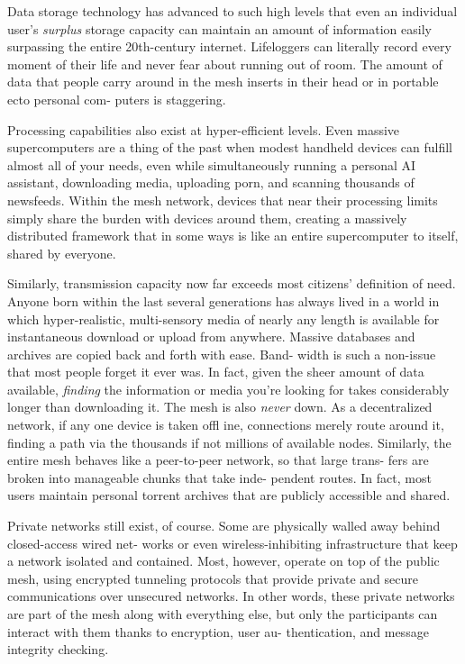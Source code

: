 Data storage technology has advanced to such high 
levels that even an individual user's \textit{surplus }storage 
capacity can maintain an amount of information 
easily surpassing the entire 20th-century internet. 
Lifeloggers can literally record every moment of their 
life and never fear about running out of room. The 
amount of data that people carry around in the mesh 
inserts in their head or in portable ecto personal com-
puters is staggering.

Processing capabilities also exist at hyper-efficient 
levels. Even massive supercomputers are a thing of the 
past when modest handheld devices can fulfill almost 
all of your needs, even while simultaneously running a 
personal AI assistant, downloading media, uploading 
porn, and scanning thousands of newsfeeds. Within 
the mesh network, devices that near their processing 
limits simply share the burden with devices around 
them, creating a massively distributed framework that 
in some ways is like an entire supercomputer to itself, 
shared by everyone.

Similarly, transmission capacity now far exceeds 
most citizens' definition of need. Anyone born within 
the last several generations has always lived in a world 
in which hyper-realistic, multi-sensory media of nearly 
any length is available for instantaneous download 
or upload from anywhere. Massive databases and 
archives are copied back and forth with ease. Band-
width is such a non-issue that most people forget it ever 
was. In fact, given the sheer amount of data available, 
\textit{finding }the information or media you're looking for 
takes considerably longer than downloading it. The 
mesh is also \textit{never }down. As a decentralized network, 
if any one device is taken offl ine, connections merely 
route around it, finding a path via the thousands if not 
millions of available nodes. Similarly, the entire mesh 
behaves like a peer-to-peer network, so that large trans-
fers are broken into manageable chunks that take inde-
pendent routes. In fact, most users maintain personal 
torrent archives that are publicly accessible and shared.

Private networks still exist, of course. Some are 
physically walled away behind closed-access wired net-
works or even wireless-inhibiting infrastructure that 
keep a network isolated and contained. Most, however, 
operate on top of the public mesh, using encrypted 
tunneling protocols that provide private and secure 
communications over unsecured networks. In other 
words, these private networks are part of the mesh 
along with everything else, but only the participants 
can interact with them thanks to encryption, user au-
thentication, and message integrity checking.

